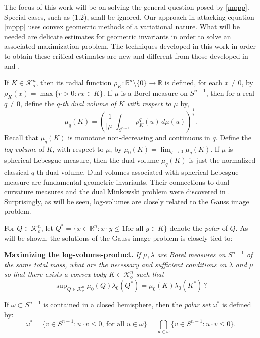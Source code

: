 \documentclass{cpamart1}     %
\theoremstyle{definition}
\theoremstyle{remark}
\newcommand{\ro}{\mathbb R}
\newcommand{\rn}{\mathbb R^n}
\newcommand{\sn}{S^{n-1}}
\newcommand{\kno}{\mathcal K^n_o}
\begin{document}
The focus of this work will be on solving the general question posed by \eqref{mppp}. 
Special cases, such as (1.2), shall be ignored. Our approach in attacking equation \eqref{mppp} uses convex geometric methods of a variational nature. What will be needed are delicate estimates for geometric invariants in order to solve an
associated maximization problem. The techniques developed in this work in order to obtain these critical estimates are new and different from those developed in \cite{BLYZ13jams} and \cite{HLYZ16}.


\smallskip

If $K\in\kno$, then its
radial function $\rho_K:\rn\setminus \{0\} \to \ro$
is defined, for each $x \neq 0$, by $\rho_K(x) = \max\{r>0 : r x \in K\}$. If $\mu$ is
a Borel measure on $\sn$, then for a real $q\neq 0$, define the {\it $q$-th dual
 volume of $K$ with respect to $\mu$} by,
\[
\mu_q(K) = \left(\frac1{|\mu|}\int_{\sn} \rho_K^q(u) \, d\mu(u)\right)^\frac1q.
\]
Recall that $\mu_q(K)$ is monotone non-decreasing and continuous in $q$.
Define the {\it log-volume} of $K$, 
with respect to 
$\mu$, by $\mu_0(K)=\lim_{q\to 0}\mu_q(K)$.
If $\mu$ is spherical Lebesgue measure, then the dual volume
$\mu_q(K)$ is just the normalized classical $q$-th dual volume. Dual volumes
associated with spherical Lebesgue measure are
fundamental geometric invariants. Their connections to dual curvature measures and
the dual Minkowski problem were discovered in \cite{HLYZ16}. Surprisingly, as will be seen, log-volumes
are closely related to the Gauss image problem.

For $Q\in\kno$, let $Q^*=\{x\in\rn: \text{$x\cdot y\le 1$
for all $y\in K$}\}$ denote the {\it polar} of $Q$.
As will be shown, the solutions of the Gauss image problem is closely tied to:
\vspace{4mm}

\noindent
{\bf Maximizing the log-volume-product.}
{\it If $\mu, \lambda$ are Borel measures on $\sn$
of the same total mass, 
what are the necessary and sufficient conditions on $\lambda$ and $\mu$ so that
there exists a convex body
$K\in\kno$ such that
\[
\sup\nolimits_{Q\in \kno} \mu_0(Q) \lambda_0(Q^*) = \mu_0(K) \lambda_0(K^*)\, ?
\]
}

If $\omega\subset S^{n-1}$ is contained in a closed hemisphere,
then the {\it polar set} $\omega^*$ is defined by:
\begin{equation}\label{polarset}
\omega^* =\{v\in S^{n-1} : \text{$u\cdot v\leq 0$, for all $u\in\omega$}\}=
\bigcap_{u\in\omega}\{v\in S^{n-1} : u\cdot v\leq 0 \}.
\end{equation}
\end{document}
